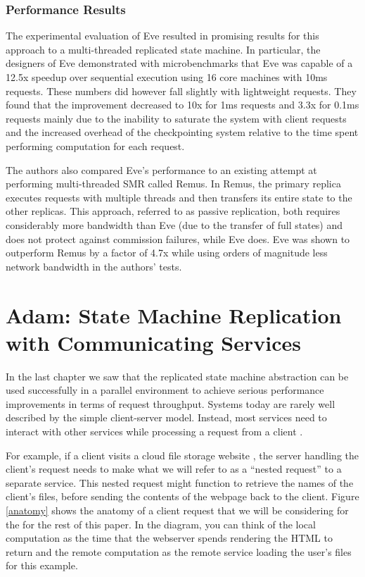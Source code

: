 \documentclass[11pt, oneside]{report}
\begin{document}
\subsection{Performance Results}\label{EveResults}

The experimental evaluation of Eve resulted in promising results for this approach to a multi-threaded replicated state machine. 
In particular, the designers of Eve demonstrated with microbenchmarks that Eve was capable of a 12.5x speedup over sequential execution using 16 core machines with 10ms requests. 
These numbers did however fall slightly with lightweight requests. 
They found that the improvement decreased to 10x for 1ms requests and 3.3x for 0.1ms requests mainly due to the inability to saturate the system with client requests and the increased overhead of the checkpointing system relative to the time spent performing computation for each request.

The authors also compared Eve's performance to an existing attempt at performing multi-threaded SMR called Remus. 
In Remus, the primary replica executes requests with multiple threads and then transfers its entire state to the other replicas. 
This approach, referred to as passive replication, both requires considerably more bandwidth than Eve (due to the transfer of full states) and does not protect against commission failures, while Eve does. 
Eve was shown to outperform Remus by a factor of 4.7x while using orders of magnitude less network bandwidth in the authors' tests.

\chapter{Adam: State Machine Replication with Communicating Services}\label{Adam}

In the last chapter we saw that the replicated state machine abstraction can be used successfully in a parallel environment to achieve serious performance improvements in terms of request throughput. 
Systems today are rarely well described by the simple client-server model.
Instead, most services need to interact with other services while processing a request from a client \cite{tao, spanner, dynamo}. 

For example, if a client visits a cloud file storage website \cite{dropbox}, the server handling the client's request needs to make what we will refer to as a ``nested request'' to a separate service. This nested request might function to retrieve the names of the client's files, before sending the contents of the webpage back to the client. Figure \ref{anatomy} shows the anatomy of a client request that we will be considering for the for the rest of this paper. In the diagram, you can think of the local computation as the time that the webserver spends rendering the HTML to return and the remote computation as the remote service loading the user's files for this example.
\end{document}
